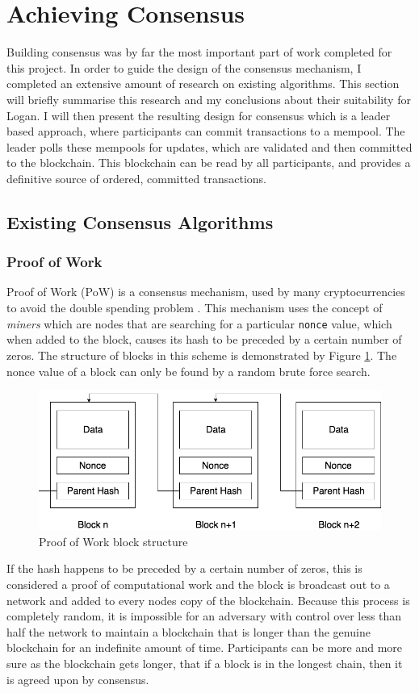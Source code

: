 \documentclass[12pt,a4paper,twoside,openright]{report}
\begin{document}
	\section{Achieving Consensus}\label{sec:consensus}
	Building consensus was by far the most important part of work completed for this project. 
	In order to guide the design of the consensus mechanism, I completed an extensive amount of research on existing algorithms.
	This section will briefly summarise this research and my conclusions about their suitability for Logan.
	I will then present the resulting design for consensus which is a leader based approach, where participants can commit transactions to a mempool.
	The leader polls these mempools for updates, which are validated and then committed to the blockchain.
	This blockchain can be read by all participants, and provides a definitive source of ordered, committed transactions.

	\subsection{Existing Consensus Algorithms} 
	\subsubsection*{Proof of Work} 
	Proof of Work (PoW) is a consensus mechanism, used by many cryptocurrencies to avoid the double spending problem \parencite{Bitcoin}. 
	This mechanism uses the concept of \textit{miners} which are nodes that are searching for a particular \texttt{nonce} value, which when added to the block, causes its hash to be preceded by a certain number of zeros.
	The structure of blocks in this scheme is demonstrated by Figure \ref{figs:pow}. 
	The nonce value of a block can only be found by a random brute force search.
	\begin{figure}
		\centering
		\includegraphics[width=13cm]{figs/PoW.png}
		\caption{Proof of Work block structure}
		\label{figs:pow}
	\end{figure}
	If the hash happens to be preceded by a certain number of zeros, this is considered a proof of computational work and the block is broadcast out to a network and added to every nodes copy of the blockchain.
	Because this process is completely random, it is impossible for an adversary with control over less than half the network to maintain a blockchain that is longer than the genuine blockchain for an indefinite amount of time.
	Participants can be more and more sure as the blockchain gets longer, that if a block is in the longest chain, then it is agreed upon by consensus. \\
\end{document}
